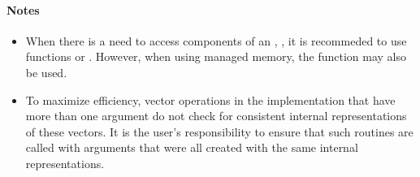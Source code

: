 \paragraph{\bf Notes}

\begin{itemize}

\item
  When there is a need to access components of an , ,
  it is recommeded to use functions  or
  . However, when using managed memory, the
  function  may also be used.

\item
  {\warn}To maximize efficiency, vector operations in the {\nveccuda} implementation
  that have more than one  argument do not check for
  consistent internal representations of these vectors. It is the user's
  responsibility to ensure that such routines are called with 
  arguments that were all created with the same internal representations.

\end{itemize}
